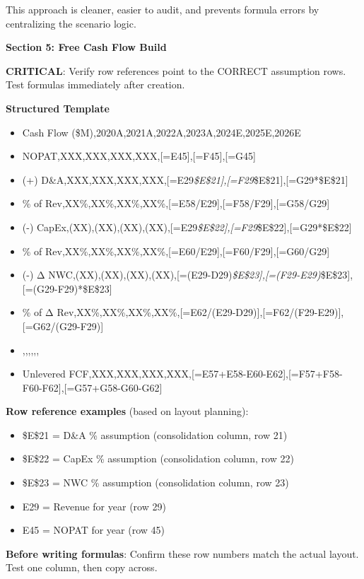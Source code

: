 \documentclass[11pt]{article}
\begin{document}
This approach is cleaner, easier to audit, and prevents formula errors by centralizing the scenario logic.


\textbf{Section 5: Free Cash Flow Build}


\textbf{CRITICAL}: Verify row references point to the CORRECT assumption rows. Test formulas immediately after creation.


\textbf{Structured Template}
\begin{itemize}[leftmargin=*,itemsep=2pt,topsep=2pt]
\item {} Cash Flow (\$M),2020A,2021A,2022A,2023A,2024E,2025E,2026E
\item {} NOPAT,XXX,XXX,XXX,XXX,[=E45],[=F45],[=G45]
\item {} (+) D\&A,XXX,XXX,XXX,XXX,[=E29\emph{\$E\$21],[=F29}\$E\$21],[=G29*\$E\$21]
\item {} \% of Rev,XX\%,XX\%,XX\%,XX\%,[=E58/E29],[=F58/F29],[=G58/G29]
\item {} (-) CapEx,(XX),(XX),(XX),(XX),[=E29\emph{\$E\$22],[=F29}\$E\$22],[=G29*\$E\$22]
\item {} \% of Rev,XX\%,XX\%,XX\%,XX\%,[=E60/E29],[=F60/F29],[=G60/G29]
\item {} (-) Δ NWC,(XX),(XX),(XX),(XX),[=(E29-D29)\emph{\$E\$23],[=(F29-E29)}\$E\$23],[=(G29-F29)*\$E\$23]
\item {} \% of Δ Rev,XX\%,XX\%,XX\%,XX\%,[=E62/(E29-D29)],[=F62/(F29-E29)],[=G62/(G29-F29)]
\item {} ,,,,,,
\item {} Unlevered FCF,XXX,XXX,XXX,XXX,[=E57+E58-E60-E62],[=F57+F58-F60-F62],[=G57+G58-G60-G62]
\end{itemize}

\textbf{Row reference examples} (based on layout planning):

\begin{itemize}[leftmargin=*,itemsep=2pt,topsep=2pt]
\item {} \$E\$21 = D\&A \% assumption (consolidation column, row 21)
\item {} \$E\$22 = CapEx \% assumption (consolidation column, row 22)
\item {} \$E\$23 = NWC \% assumption (consolidation column, row 23)
\item {} E29 = Revenue for year (row 29)
\item {} E45 = NOPAT for year (row 45)
\end{itemize}

\textbf{Before writing formulas}: Confirm these row numbers match the actual layout. Test one column, then copy across.
\end{document}
